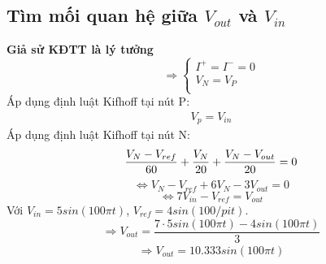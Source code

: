 \subsection{Tìm mối quan hệ giữa $V_{out}$ và $V_{in}$}
\hspace*{0.6cm}\textbf{Giả sử KĐTT là lý tưởng}
				\[
				\Rightarrow
				\begin{cases}
					I^+ = I^- = 0\\
					V_N = V_P\\
				\end{cases}
				\]
Áp dụng định luật Kifhoff tại nút P:
\begin{align}
    V_p = V_{in}
\end{align}
Áp dụng định luật Kifhoff tại nút N:
\[
    \frac{V_N-V_{ref}}{60} + \frac{V_N}{20} + \frac{V_N-V_{out}}{20} = 0 \\ 
\]
\[
    \Longleftrightarrow V_N - V_{ref} + 6V_N - 3V_{out} = 0 
\]
\[
    \Longleftrightarrow 7V_{in} - V_{ref} = V_{out}
\]
Với $V_{in} = 5sin(100\pi t)$, $V_{ref} = 4sin(100/pi t)$.
\[
    \Rightarrow V_{out} = \frac{7 \cdot 5sin(100\pi t) - 4sin(100\pi t)}{3}
\]
\begin{align}
    \Rightarrow V_{out} = 10.333sin(100\pi t)
\end{align}
\cleardoublepage
